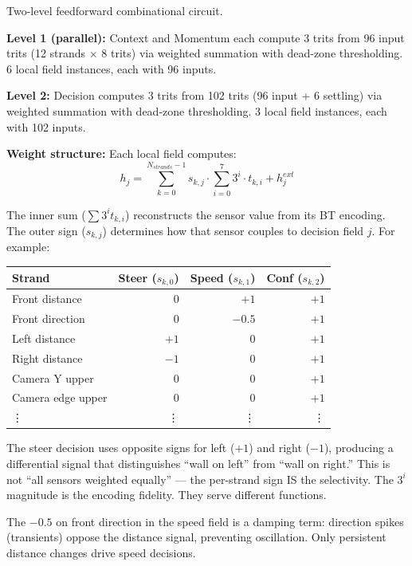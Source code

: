 \documentclass[11pt, a4paper]{article}
\begin{document}
Two-level feedforward combinational circuit.

\textbf{Level 1 (parallel):} Context and Momentum each compute
3 trits from 96 input trits (12 strands $\times$ 8 trits) via
weighted summation with dead-zone thresholding. 6 local field
instances, each with 96 inputs.

\textbf{Level 2:} Decision computes 3 trits from 102 trits
(96 input + 6 settling) via weighted summation with dead-zone
thresholding. 3 local field instances, each with 102 inputs.

\textbf{Weight structure:} Each local field computes:
\begin{equation}
  h_j = \sum_{k=0}^{N_{strands}-1} s_{k,j} \cdot
        \sum_{i=0}^{7} 3^i \cdot t_{k,i} + h_j^{ext}
\end{equation}

The inner sum ($\sum 3^i t_{k,i}$) reconstructs the sensor value
from its BT encoding. The outer sign ($s_{k,j}$) determines how
that sensor couples to decision field $j$. For example:

\begin{center}
\begin{tabular}{@{}lrrr@{}}
\toprule
\textbf{Strand} & \textbf{Steer ($s_{k,0}$)} & \textbf{Speed ($s_{k,1}$)} & \textbf{Conf ($s_{k,2}$)} \\
\midrule
Front distance   & 0      & $+1$   & $+1$ \\
Front direction  & 0      & $-0.5$ & $+1$ \\
Left distance    & $+1$   & 0      & $+1$ \\
Right distance   & $-1$   & 0      & $+1$ \\
Camera Y upper   & 0      & 0      & $+1$ \\
Camera edge upper & 0     & 0      & $+1$ \\
\vdots           & \vdots & \vdots & \vdots \\
\bottomrule
\end{tabular}
\end{center}

The steer decision uses opposite signs for left ($+1$) and right
($-1$), producing a differential signal that distinguishes ``wall
on left'' from ``wall on right.'' This is not ``all sensors
weighted equally'' --- the per-strand sign IS the selectivity.
The $3^i$ magnitude is the encoding fidelity. They serve different
functions.

The $-0.5$ on front direction in the speed field is a damping
term: direction spikes (transients) oppose the distance signal,
preventing oscillation. Only persistent distance changes drive
speed decisions.
\end{document}
